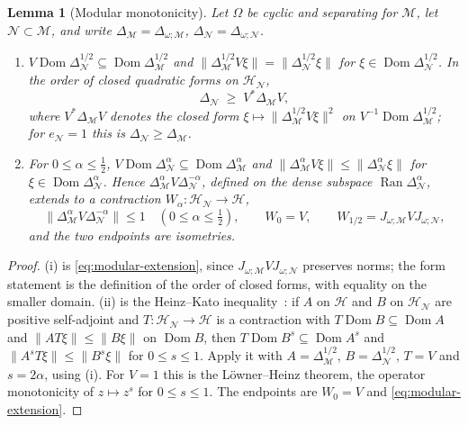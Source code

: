 \documentclass[a4paper,11pt]{article}
\newtheorem{lemma}[theorem]{Lemma}
\theoremstyle{definition}
\newcommand{\mN}{\mathcal{N}}
\newcommand{\mH}{\mathcal{H}}
\newcommand{\mM}{\mathcal{M}}
\begin{document}
\begin{lemma}[Modular monotonicity]\label{lem:modular-monotonicity}
Let $\Omega$ be cyclic and separating for $\mM$, let $\mN\subset\mM$, and write $\Delta_{\mM}=\Delta_{\omega;\mM}$, $\Delta_{\mN}=\Delta_{\omega;\mN}$.
\begin{enumerate}
 \item[\rm(i)] $V\operatorname{Dom}\Delta_{\mN}^{1/2}\subseteq\operatorname{Dom}\Delta_{\mM}^{1/2}$ and $\|\Delta_{\mM}^{1/2}V\xi\|=\|\Delta_{\mN}^{1/2}\xi\|$ for $\xi\in\operatorname{Dom}\Delta_{\mN}^{1/2}$. In the order of closed quadratic forms on $\mH_{\mN}$,
 \begin{equation}
  \Delta_{\mN}\;\geq\;V^*\Delta_{\mM}V ,
  \label{eq:modular-inequality}
 \end{equation}
 where $V^*\Delta_{\mM}V$ denotes the closed form $\xi\mapsto\|\Delta_{\mM}^{1/2}V\xi\|^2$ on $V^{-1}\operatorname{Dom}\Delta_{\mM}^{1/2}$; for $e_{\mN}=1$ this is $\Delta_{\mN}\geq\Delta_{\mM}$.
 \item[\rm(ii)] For $0\le\alpha\le\tfrac12$, $V\operatorname{Dom}\Delta_{\mN}^{\alpha}\subseteq\operatorname{Dom}\Delta_{\mM}^{\alpha}$ and $\|\Delta_{\mM}^{\alpha}V\xi\|\le\|\Delta_{\mN}^{\alpha}\xi\|$ for $\xi\in\operatorname{Dom}\Delta_{\mN}^{\alpha}$. Hence $\Delta_{\mM}^{\alpha}V\Delta_{\mN}^{-\alpha}$, defined on the dense subspace $\operatorname{Ran}\Delta_{\mN}^{\alpha}$, extends to a contraction $W_\alpha:\mH_{\mN}\to\mathcal H$,
 \begin{equation}
  \|\Delta_{\mM}^{\alpha}V\Delta_{\mN}^{-\alpha}\|\le1\quad(0\le\alpha\le\tfrac12),
  \qquad W_0=V,\qquad W_{1/2}=J_{\omega;\mM}VJ_{\omega;\mN},
  \label{eq:characteristic-bounded}
 \end{equation}
 and the two endpoints are isometries.
\end{enumerate}
\end{lemma}
\begin{proof}
(i) is \eqref{eq:modular-extension}, since $J_{\omega;\mM}VJ_{\omega;\mN}$ preserves norms; the form statement is the definition of the order of closed forms, with equality on the smaller domain. (ii) is the Heinz--Kato inequality~\cite{Kato1952}: if $A$ on $\mathcal H$ and $B$ on $\mH_{\mN}$ are positive self-adjoint and $T:\mH_{\mN}\to\mathcal H$ is a contraction with $T\operatorname{Dom}B\subseteq\operatorname{Dom}A$ and $\|AT\xi\|\le\|B\xi\|$ on $\operatorname{Dom}B$, then $T\operatorname{Dom}B^{s}\subseteq\operatorname{Dom}A^{s}$ and $\|A^{s}T\xi\|\le\|B^{s}\xi\|$ for $0\le s\le1$. Apply it with $A=\Delta_{\mM}^{1/2}$, $B=\Delta_{\mN}^{1/2}$, $T=V$ and $s=2\alpha$, using (i). For $V=1$ this is the L\"owner--Heinz theorem, the operator monotonicity of $z\mapsto z^{s}$ for $0\le s\le1$. The endpoints are $W_0=V$ and \eqref{eq:modular-extension}.
\end{proof}
\end{document}
